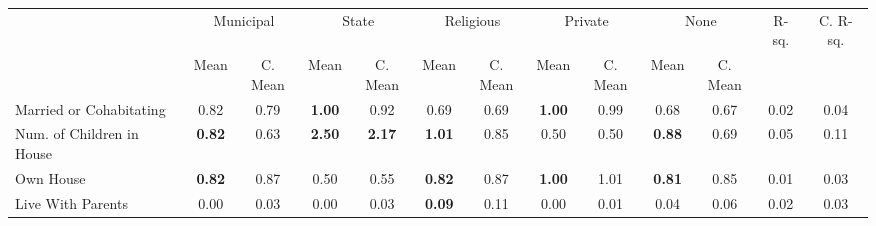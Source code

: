 \begin{tabular}{l c c c c c c c c c c c c}
\toprule
& \multicolumn{2}{c}{Municipal} & \multicolumn{2}{c}{State} & \multicolumn{2}{c}{Religious} & \multicolumn{2}{c}{Private} & \multicolumn{2}{c}{None} & R-sq. & C. R-sq. \\
& \scriptsize Mean & \scriptsize C. Mean & \scriptsize Mean & \scriptsize C. Mean & \scriptsize Mean & \scriptsize C. Mean & \scriptsize Mean & \scriptsize C. Mean & \scriptsize Mean & \scriptsize C. Mean & & \\
\midrule
Married or Cohabitating &      0.82 & 0.79 & \textbf{     1.00} & 0.92 &      0.69 & 0.69 & \textbf{     1.00} & 0.99 &      0.68 & 0.67 &      0.02 &      0.04 \\
Num. of Children in House & \textbf{     0.82} & 0.63 & \textbf{     2.50} & \textbf{     2.17} & \textbf{     1.01} & 0.85 &      0.50 & 0.50 & \textbf{     0.88} & 0.69 &      0.05 &      0.11 \\
Own House & \textbf{     0.82} & 0.87 &      0.50 & 0.55 & \textbf{     0.82} & 0.87 & \textbf{     1.00} & 1.01 & \textbf{     0.81} & 0.85 &      0.01 &      0.03 \\
Live With Parents &      0.00 & 0.03 &      0.00 & 0.03 & \textbf{     0.09} & 0.11 &      0.00 & 0.01 &      0.04 & 0.06 &      0.02 &      0.03 \\
\bottomrule
\end{tabular}
